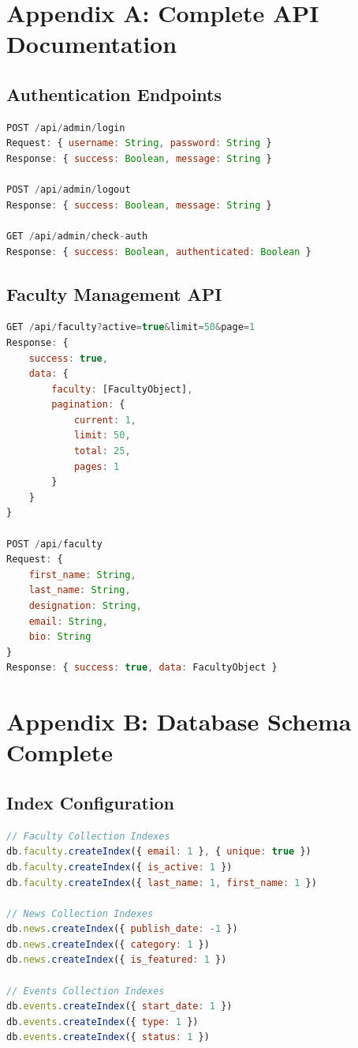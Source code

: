 \documentclass[12pt,a4paper]{report}
\begin{document}
\section{Appendix A: Complete API Documentation}
\subsection{Authentication Endpoints}
\begin{lstlisting}[language=JavaScript, caption=Admin Authentication API]
POST /api/admin/login
Request: { username: String, password: String }
Response: { success: Boolean, message: String }

POST /api/admin/logout
Response: { success: Boolean, message: String }

GET /api/admin/check-auth
Response: { success: Boolean, authenticated: Boolean }
\end{lstlisting}

\subsection{Faculty Management API}
\begin{lstlisting}[language=JavaScript, caption=Faculty API Details]
GET /api/faculty?active=true&limit=50&page=1
Response: {
    success: true,
    data: {
        faculty: [FacultyObject],
        pagination: {
            current: 1,
            limit: 50,
            total: 25,
            pages: 1
        }
    }
}

POST /api/faculty
Request: {
    first_name: String,
    last_name: String,
    designation: String,
    email: String,
    bio: String
}
Response: { success: true, data: FacultyObject }
\end{lstlisting}

\section{Appendix B: Database Schema Complete}
\subsection{Index Configuration}
\begin{lstlisting}[language=JavaScript, caption=Database Indexes]
// Faculty Collection Indexes
db.faculty.createIndex({ email: 1 }, { unique: true })
db.faculty.createIndex({ is_active: 1 })
db.faculty.createIndex({ last_name: 1, first_name: 1 })

// News Collection Indexes
db.news.createIndex({ publish_date: -1 })
db.news.createIndex({ category: 1 })
db.news.createIndex({ is_featured: 1 })

// Events Collection Indexes
db.events.createIndex({ start_date: 1 })
db.events.createIndex({ type: 1 })
db.events.createIndex({ status: 1 })
\end{lstlisting}
\end{document}
